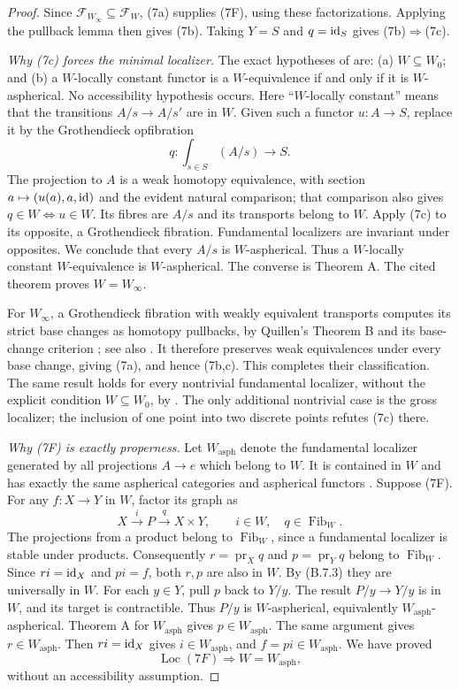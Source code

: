 \begin{proof}
Since $\mathcal F_{W_\infty}\subseteq\mathcal F_W$,
(7a) supplies (7F), using these factorizations. Applying
the pullback lemma then gives (7b). Taking $Y=S$ and
$q=\mathrm{id}_S$ gives (7b)$\Rightarrow$(7c).

\emph{Why (7c) forces the minimal localizer.}
The exact hypotheses of
\citet[Theorem~6.4.22]{Cisinski2006} are:
(a) $W\subseteq W_0$; and (b) a $W$-locally constant
functor is a $W$-equivalence if and only if it is
$W$-aspherical. No accessibility hypothesis occurs.
Here ``$W$-locally constant'' means that the transitions
$A/s\to A/s'$ are in $W$.
Given such a functor $u:A\to S$, replace it by the
Grothendieck opfibration
\[
 q:\int_{s\in S}(A/s)\longrightarrow S.
\]
The projection to $A$ is a weak homotopy equivalence,
with section $a\mapsto(u(a),a,\mathrm{id})$ and the evident
natural comparison; that comparison also gives
$q\in W\Longleftrightarrow u\in W$.
Its fibres are $A/s$ and its transports belong to $W$.
Apply (7c) to its opposite, a Grothendieck fibration.
Fundamental localizers are invariant under opposites.
We conclude that every $A/s$ is $W$-aspherical.
Thus a $W$-locally constant $W$-equivalence is
$W$-aspherical. The converse is Theorem A.
The cited theorem proves $W=W_\infty$.

For $W_\infty$, a Grothendieck fibration with weakly
equivalent transports computes its strict base changes
as homotopy pullbacks, by Quillen's Theorem B and its
base-change criterion
\citep[\S1, Theorem B and its corollary]{Quillen1973};
see also \citet[Proposition~2.7]{Rezk1998Sharp}.
It therefore preserves weak equivalences under every
base change, giving (7a), and hence (7b,c). This completes
their classification. The same result holds for every
nontrivial fundamental localizer, without the explicit
condition $W\subseteq W_0$, by
\citet[Remark~6.4.23]{Cisinski2006}. The only additional
nontrivial case is the gross localizer; the inclusion of
one point into two discrete points refutes (7c) there.

\emph{Why (7F) is exactly properness.}
Let $W_{\mathrm{asph}}$ denote the fundamental localizer
generated by all projections $A\to e$ which belong
to $W$. It is contained in $W$ and has exactly the same
aspherical categories and aspherical functors
\citep[\S6.1.7]{Cisinski2006}.
Suppose (7F). For any $f:X\to Y$ in $W$, factor its
graph as
\[
 X\xrightarrow{i}P\xrightarrow{q}X\times Y,
 \qquad i\in W,\quad q\in\operatorname{Fib}_W.
\]
The projections from a product belong to
$\operatorname{Fib}_W$, since a fundamental localizer
is stable under products. Consequently
$r=\operatorname{pr}_Xq$ and $p=\operatorname{pr}_Yq$
belong to $\operatorname{Fib}_W$. Since $ri=\mathrm{id}_X$
and $pi=f$, both $r,p$ are also in $W$.
By (B.7.3) they are universally in $W$.
For each $y\in Y$, pull $p$ back to $Y/y$. The result
$P/y\to Y/y$ is in $W$, and its target is contractible.
Thus $P/y$ is $W$-aspherical, equivalently
$W_{\mathrm{asph}}$-aspherical. Theorem A for
$W_{\mathrm{asph}}$ gives $p\in W_{\mathrm{asph}}$.
The same argument gives $r\in W_{\mathrm{asph}}$.
Then $ri=\mathrm{id}_X$ gives $i\in W_{\mathrm{asph}}$, and
$f=pi\in W_{\mathrm{asph}}$. We have proved
\[
 \operatorname{Loc}(7F)\Longrightarrow W=W_{\mathrm{asph}},
\tag{B.7.4}
\]
without an accessibility assumption.


\end{proof}
